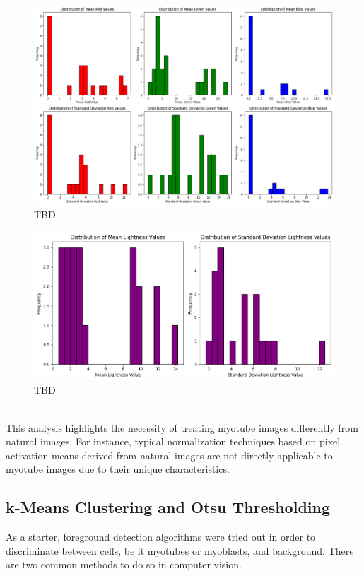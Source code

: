 \begin{figure}
	\centering
	\includegraphics[width=\textwidth]{"images/pixel_distribution_plots_rgb.png"}
	\caption[TBD]{TBD}
	\label{fig2}
\end{figure}
\begin{figure}
	\centering
	\includegraphics[width=\textwidth]{"images/pixel_distribution_plots_hsl.png"}
	\caption[TBD]{TBD}
	\label{fig3}
\end{figure}
\ \\
This analysis highlights the necessity of treating myotube images differently from natural images. For instance, typical normalization techniques based on pixel activation means derived from natural images are not directly applicable to myotube images due to their unique characteristics.

\subsection{k-Means Clustering and Otsu Thresholding}
As a starter, foreground detection algorithms were tried out in order to discriminate between cells, be it myotubes or myoblasts, and background. There are two common methods to do so in computer vision. 

